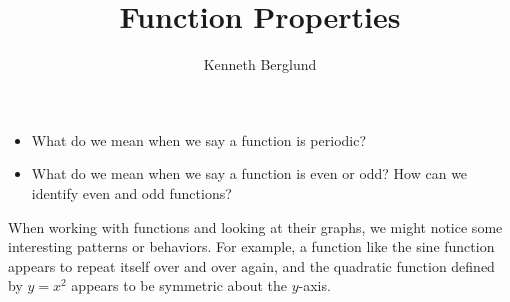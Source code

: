 \documentclass[nooutcomes]{ximera}
\author{Kenneth Berglund}
\title{Function Properties}
\begin{document}
\licenseAPCSZ
\begin{abstract}
  
\end{abstract}
\maketitle



\begin{motivatingQuestions}\begin{itemize}
\item What do we mean when we say a function is periodic?
\item What do we mean when we say a function is even or odd? How can we identify even and odd functions?
\end{itemize}\end{motivatingQuestions}



When working with functions and looking at their graphs, we might notice some interesting patterns or behaviors. For example, a function like the sine function appears to repeat itself over and over again, and the quadratic function defined by $y = x^2$ appears to be symmetric about the $y$-axis. 

\begin{image}

\end{image}
\end{document}
